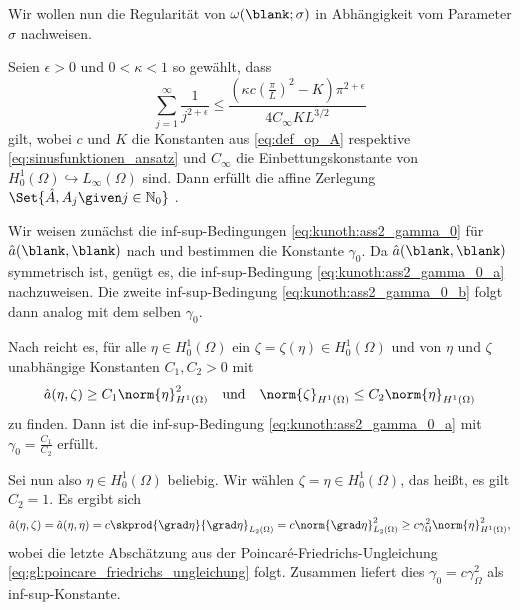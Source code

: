Wir wollen nun die Regularität von $\omega(\blank; \sigma)$ in Abhängigkeit vom Parameter $\sigma$ nachweisen.

\begin{Satz}
\label{satz:regularitaet_nachrechnen}
    Seien $\epsilon > 0$ und $0 < \kappa < 1$ so gewählt, dass
    \begin{equation}
        \sum_{j = 1}^{\infty} \frac{1}{j^{2 + \epsilon}} \leq \frac{(\kappa c (\tfrac{\pi}{L})^{2} - K) \pi^{2 + \epsilon}}{4 C_{\infty} K L^{3/2}}
    \end{equation}
    gilt,
    wobei $c$ und $K$ die Konstanten aus \eqref{eq:def_op_A} respektive \eqref{eq:sinusfunktionen_ansatz} und $C_{\infty}$ die Einbettungskonstante von $H^{1}_{0}(\Omega) \hookrightarrow L_{\infty}(\Omega)$ sind.
    Dann erfüllt die affine Zerlegung $\Set{\hat A, A_{j} \given j \in \mathbb{N}_{0}}$ .

    \begin{Beweis}
        Wir weisen zunächst die inf-sup-Bedingungen \eqref{eq:kunoth:ass2_gamma_0} für $\hat a(\blank, \blank)$ nach und bestimmen die Konstante $\gamma_{0}$.
        Da $\hat a(\blank, \blank)$ symmetrisch ist, genügt es, die inf-sup-Bedingung \eqref{eq:kunoth:ass2_gamma_0_a} nachzuweisen. Die zweite inf-sup-Bedingung \eqref{eq:kunoth:ass2_gamma_0_b} folgt dann analog mit dem selben $\gamma_{0}$.

        Nach  reicht es, für alle $\eta \in H^{1}_{0}(\Omega)$ ein $\zeta = \zeta(\eta) \in H^{1}_{0}(\Omega)$ und von $\eta$ und $\zeta$ unabhängige Konstanten $C_{1}, C_{2} > 0$ mit
        \begin{equation}
            \hat a(\eta, \zeta) \geq C_{1} \norm{\eta}_{H^{1}(\Omega)}^{2} \quad \text{und} \quad \norm{\zeta}_{H^{1}(\Omega)} \leq C_{2} \norm{\eta}_{H^{1}(\Omega)}
        \end{equation}
        zu finden.
        Dann ist die inf-sup-Bedingung \eqref{eq:kunoth:ass2_gamma_0_a} mit $\gamma_{0} = \frac{C_{1}}{C_{2}}$ erfüllt.

        Sei nun also $\eta \in H^{1}_{0}(\Omega)$ beliebig.
        Wir wählen $\zeta = \eta \in H^{1}_{0}(\Omega)$, das heißt, es gilt $C_{2} = 1$.
        Es ergibt sich
        \begin{align}
            \hat a(\eta, \zeta) = \hat a(\eta, \eta) = c \skprod{\grad \eta}{\grad \eta}_{L_{2}(\Omega)} = c \norm{\grad \eta}_{L_{2}(\Omega)}^{2} \geq c \gamma_{\Omega}^{2} \norm{\eta}_{H^{1}(\Omega)}^{2},
        \end{align}
        wobei die letzte Abschätzung aus der Poincaré-Friedrichs-Ungleichung \eqref{eq:gl:poincare_friedrichs_ungleichung} folgt.
        Zusammen liefert dies $\gamma_{0} = c \gamma_{\Omega}^{2}$ als inf-sup-Konstante.


\end{Beweis}
\end{Satz}
